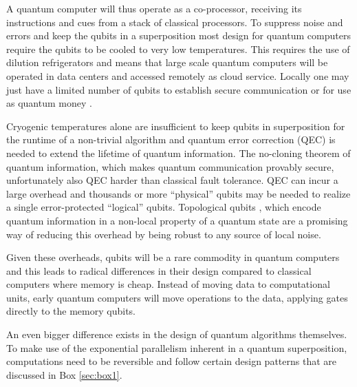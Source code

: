 \documentclass[journal]{IEEEtran}
\begin{document}
A quantum computer will thus operate as a co-processor, receiving its instructions and cues from a stack of classical processors. To suppress noise and errors and keep the qubits in a superposition most design for quantum computers require the qubits to be cooled to very low temperatures. This requires the use of dilution refrigerators and means that large scale quantum computers will be operated in data centers and accessed remotely as cloud service. Locally one may just have a limited number of qubits to establish secure communication or for use as quantum money .

Cryogenic temperatures alone are insufficient to keep qubits in superposition for the runtime of a non-trivial algorithm and quantum error correction (QEC) \cite{qec} is needed to extend the lifetime of quantum information. The no-cloning theorem of quantum information, which makes quantum communication provably secure, unfortunately also QEC harder than classical fault tolerance. QEC can incur a large overhead and thousands or more ``physical'' qubits may be needed to realize a single error-protected ``logical'' qubits. Topological qubits \cite{tqc}, which  encode  quantum information in a non-local property of a quantum state are a promising way of reducing this overhead by being robust to any source of local noise. 

Given these overheads, qubits will be a rare commodity in quantum computers and this leads to radical differences in their design compared  to classical computers where memory is cheap. Instead of moving data to computational units, early quantum computers will move operations to the data, applying gates directly to the memory qubits.

 An even bigger difference exists in the design of quantum algorithms themselves. To make use of the  exponential parallelism inherent in a quantum superposition, computations need to be reversible and follow certain design patterns that are discussed in Box \ref{sec:box1}. 




 
% 
% 
% 
% 
\end{document}
